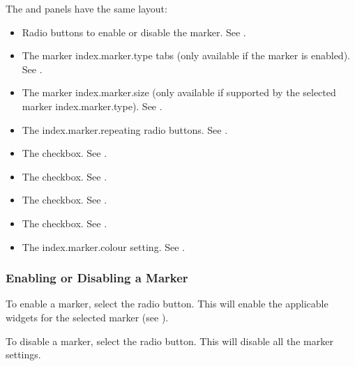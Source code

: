 The  and  panels have
the same layout:
\begin{itemize}
\item Radio buttons to enable or disable the marker.
See .

\item The marker \gls{index.marker.type} tabs (only available if the marker is
enabled). See .

\item The marker \gls{index.marker.size} (only available if
supported by the selected marker \gls{index.marker.type}).
See .

\item The \gls{index.marker.repeating} radio buttons.
See .

\item The  checkbox.
See . 

\item The  checkbox.
See .

\item The  checkbox.
See .

\item The  checkbox.
See .

\item The \gls{index.marker.colour} setting.
See .

\end{itemize}

\subsubsection{Enabling or Disabling a Marker}\label{sec:enablingmarkers}


To enable a marker, select the 
radio button. This will enable the applicable widgets for the
selected marker (see ).


To disable a marker, select the  radio
button. This will disable all the marker settings.

